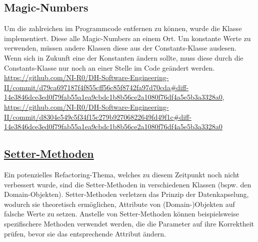 \subsection{Magic-Numbers}
Um die zahlreichen  im Programmcode entfernen zu können, wurde die Klasse  implementiert. Diese  alle Magic-Numbers an einem Ort. Um konstante Werte zu verwenden, müssen andere Klassen diese aus der Constants-Klasse auslesen. Wenn sich in Zukunft eine der Konstanten ändern sollte, muss diese durch die Constants-Klasse nur noch an einer Stelle im Code geändert werden.\\
\url{https://github.com/NI-R0/DH-Software-Engineering-II/commit/d79ca697187f4f855cff56c85f8742fa97d70cda#diff-14e3846dce3ed0f79fab55a1ea9cbdc1b8b56ce2a1080f76df4a5e5b3a3328a0},\\
\url{https://github.com/NI-R0/DH-Software-Engineering-II/commit/d8304e549c5f34f15c279b92706822649fd49f1c#diff-14e3846dce3ed0f79fab55a1ea9cbdc1b8b56ce2a1080f76df4a5e5b3a3328a0}

\subsection{\href{https://refactoring.guru/remove-setting-method}{Setter-Methoden}}
Ein potenzielles Refactoring-Thema, welches zu diesem Zeitpunkt noch nicht verbessert wurde, sind die Setter-Methoden in verschiedenen Klassen (bspw. den Domain-Objekten). Setter-Methoden verletzen das Prinzip der Datenkapselung, wodurch sie theoretisch ermöglichen, Attribute von (Domain-)Objekten auf falsche Werte zu setzen. Anstelle von Setter-Methoden können beispielsweise spezifischere Methoden verwendet werden, die die Parameter auf ihre Korrektheit prüfen, bevor sie das entsprechende Attribut ändern.



